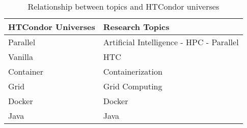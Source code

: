 \begin{table}[htbp]
    \centering
    \caption{Relationship between topics and HTCondor universes}
    \label{table:topics_universes}
    \renewcommand{\arraystretch}{1}  %
    \begin{tabular}{p{2.8cm}p{4.5cm}}
        \toprule
        \textbf{HTCondor Universes} & \textbf{Research Topics} \\
        \midrule
        Parallel & Artificial Intelligence - HPC - Parallel \\
        \addlinespace[0.8em]
        Vanilla & HTC \\
        \addlinespace[0.8em]
        Container & Containerization \\
        \addlinespace[0.8em]
        Grid & Grid Computing \\
        \addlinespace[0.8em]
        Docker & Docker \\
        \addlinespace[0.8em]
        Java & Java \\
        \bottomrule
    \end{tabular}
\end{table}
